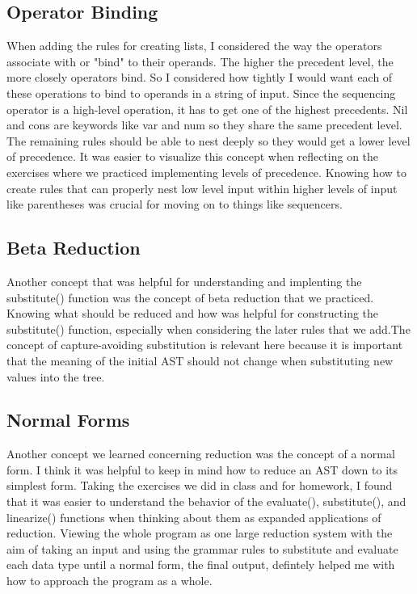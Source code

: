 \documentclass{article}
\theoremstyle{theorem}
\theoremstyle{definition}
\theoremstyle{remark}
\begin{document}
\subsection{Operator Binding}
When adding the rules for creating lists, I considered the way the operators associate with or "bind" to their operands. The higher the precedent level, the more closely 
operators bind. So I considered how tightly I would want each of these operations to bind to operands in a string of input. Since the sequencing operator is a high-level operation, it has to get one of the 
highest precedents. Nil and cons are keywords like var and num so they share the same precedent level. The remaining rules should be able to nest deeply so they would get a lower level of precedence.
\hspace{0.65cm}It was easier to visualize this concept when reflecting on the exercises where we practiced implementing levels of precedence. Knowing how to create rules that can properly nest low level input within higher levels of input like parentheses 
was crucial for moving on to things like sequencers.

\subsection{Beta Reduction}
Another concept that was helpful for understanding and implenting the substitute() function was the concept of beta reduction that we practiced. Knowing what should be reduced and how was helpful for constructing the substitute() function, 
especially when considering the later rules that we add.The concept of capture-avoiding substitution is relevant here because it is important that the meaning of the initial AST should not change when substituting new values into the tree.

\subsection{Normal Forms}
Another concept we learned concerning reduction was the concept of a normal form. I think it was helpful to keep in mind how to reduce an AST down to its simplest form. Taking the exercises we did in class and for homework, I found that it was easier to understand the behavior of 
the evaluate(), substitute(), and linearize() functions when thinking about them as expanded applications of reduction. Viewing the whole program as one large reduction system with the aim of taking an input and using the grammar rules 
to substitute and evaluate each data type until a normal form, the final output, defintely helped me with how to approach the program as a whole.
\end{document}
